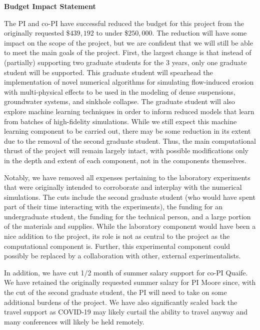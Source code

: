 \documentclass[11pt]{article}
\begin{document}
\thispagestyle{empty}
\sloppy

\begin{center}
\Large \bf Budget Impact Statement
\end{center}
\vspace{0.2in}

The PI and co-PI have successful reduced the budget for this project
from the originally requested \$$439,192$ to under \$$250,000$. The
reduction will have some impact on the scope of the project, but we are
confident that we will still be able to meet the main goals of the
project. First, the largest change is that instead of (partially)
supporting two graduate students for the 3 years, only one graduate
student will be supported. This graduate student will spearhead the
implementation of novel numerical algorithms for simulating flow-induced
erosion with multi-physical effects to be used in the modeling of dense
suspensions, groundwater systems, and sinkhole collapse. The graduate
student will also explore machine learning techniques in order to inform
reduced models that learn from batches of high-fidelity simulations.
While we still expect this machine learning component to be carried out,
there may be some reduction in its extent due to the removal of the
second graduate student. Thus, the main computational thrust of the
project will remain largely intact, with possible modifications only in
the depth and extent of each component, not in the components
themselves.

Notably, we have removed all expenses pertaining to the laboratory
experiments that were originally intended to corroborate and interplay
with the numerical simulations. The cuts include the second graduate
student (who would have spent part of their time interacting with the
experiments), the funding for an undergraduate student, the funding for
the technical person, and a large portion of the materials and supplies.
While the laboratory component would have been a nice addition to the
project, its role is not as central to the project as the computational
component is. Further, this experimental component could possibly be
replaced by a collaboration with other, external experimentalists.

In addition, we have cut 1/2 month of summer salary support for co-PI
Quaife. We have retained the originally requested summer salary for PI
Moore since, with the cut of the second graduate student, the PI will
need to take on some additional burdens of the project. We have also
significantly scaled back the travel support as COVID-19 may likely
curtail the ability to travel anyway and many conferences will likely be
held remotely.
\end{document}
